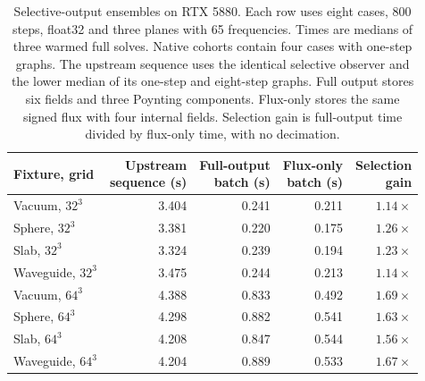 \begin{table}[tbp]
\centering
\small
\renewcommand{\arraystretch}{1.15}
\caption{Selective-output ensembles on RTX 5880. Each row uses eight cases, 800 steps, float32 and three planes with 65 frequencies. Times are medians of three warmed full solves. Native cohorts contain four cases with one-step graphs. The upstream sequence uses the identical selective observer and the lower median of its one-step and eight-step graphs. Full output stores six fields and three Poynting components. Flux-only stores the same signed flux with four internal fields. Selection gain is full-output time divided by flux-only time, with no decimation.}
\label{tab:selective-monitors}
\begin{tabular}{@{}lrrrr@{}}
\toprule
Fixture, grid & \shortstack{Upstream\\sequence (s)} & \shortstack{Full-output\\batch (s)} & \shortstack{Flux-only\\batch (s)} & \shortstack{Selection\\gain} \\
\midrule
Vacuum, $32^3$ & 3.404 & 0.241 & 0.211 & $1.14\times$ \\
Sphere, $32^3$ & 3.381 & 0.220 & 0.175 & $1.26\times$ \\
Slab, $32^3$ & 3.324 & 0.239 & 0.194 & $1.23\times$ \\
Waveguide, $32^3$ & 3.475 & 0.244 & 0.213 & $1.14\times$ \\
Vacuum, $64^3$ & 4.388 & 0.833 & 0.492 & $1.69\times$ \\
Sphere, $64^3$ & 4.298 & 0.882 & 0.541 & $1.63\times$ \\
Slab, $64^3$ & 4.208 & 0.847 & 0.544 & $1.56\times$ \\
Waveguide, $64^3$ & 4.204 & 0.889 & 0.533 & $1.67\times$ \\
\bottomrule
\end{tabular}
\end{table}
